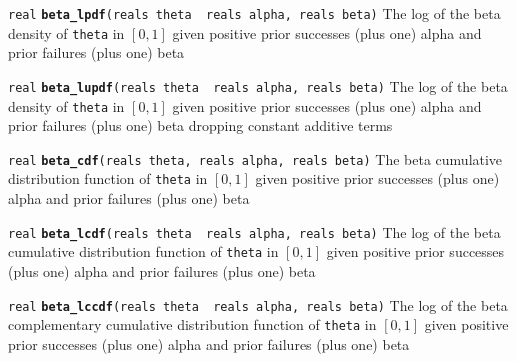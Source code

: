 \documentclass[
  10pt,
]{book}
\begin{document}

\texttt{real} \textbf{\texttt{beta\_lpdf}}\texttt{(reals\ theta\ \textbar{}\ reals\ alpha,\ reals\ beta)}\newline
The log of the beta density of \texttt{theta} in \([0,1]\) given positive prior
successes (plus one) alpha and prior failures (plus one) beta


\texttt{real} \textbf{\texttt{beta\_lupdf}}\texttt{(reals\ theta\ \textbar{}\ reals\ alpha,\ reals\ beta)}\newline
The log of the beta density of \texttt{theta} in \([0,1]\) given positive prior
successes (plus one) alpha and prior failures (plus one) beta
dropping constant additive terms


\texttt{real} \textbf{\texttt{beta\_cdf}}\texttt{(reals\ theta,\ reals\ alpha,\ reals\ beta)}\newline
The beta cumulative distribution function of \texttt{theta} in \([0,1]\) given
positive prior successes (plus one) alpha and prior failures (plus
one) beta


\texttt{real} \textbf{\texttt{beta\_lcdf}}\texttt{(reals\ theta\ \textbar{}\ reals\ alpha,\ reals\ beta)}\newline
The log of the beta cumulative distribution function of \texttt{theta} in
\([0,1]\) given positive prior successes (plus one) alpha and prior
failures (plus one) beta


\texttt{real} \textbf{\texttt{beta\_lccdf}}\texttt{(reals\ theta\ \textbar{}\ reals\ alpha,\ reals\ beta)}\newline
The log of the beta complementary cumulative distribution function of
\texttt{theta} in \([0,1]\) given positive prior successes (plus one) alpha and
prior failures (plus one) beta

\end{document}
